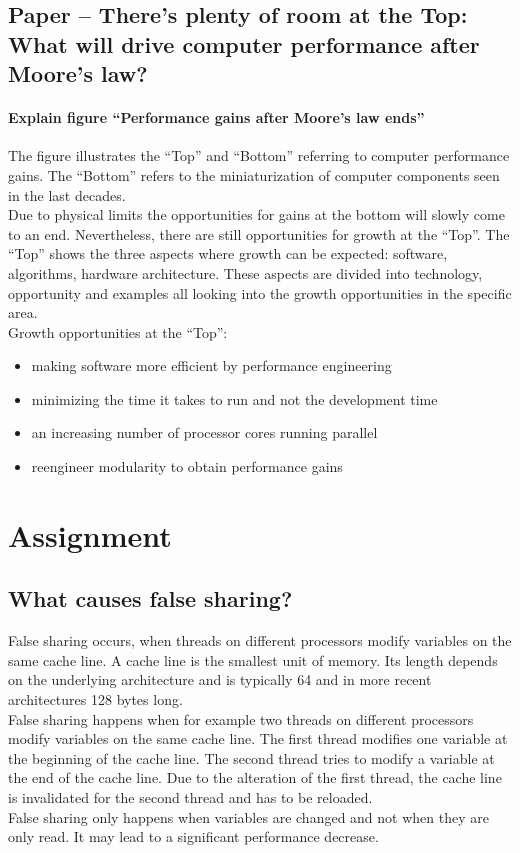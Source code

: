 \documentclass[runningheads]{llncs}
\begin{document}

\subsection {Paper – There’s plenty of room at the Top: What will drive computer performance after Moore’s law?}

\paragraph{Explain figure “Performance gains after Moore’s law ends”}
The figure illustrates the “Top” and “Bottom” referring to computer performance gains. The “Bottom” refers to the miniaturization of computer components seen in the last decades. \\
Due to physical limits the opportunities for gains at the bottom will slowly come to an end. Nevertheless, there are still opportunities for growth at the “Top”. The “Top” shows the three aspects where growth can be expected: software, algorithms, hardware architecture. These aspects are divided into technology, opportunity and examples all looking into the growth opportunities in the specific area.
\\
Growth opportunities at the “Top”:
\begin{itemize}
	\item making software more efficient by performance engineering
	\item minimizing the time it takes to run and not the development time
	\item an increasing number of processor cores running parallel
	\item reengineer modularity to obtain performance gains
\end{itemize}


\section{Assignment}

\subsection{What causes false sharing?}
False sharing occurs, when threads on different processors modify variables on the same cache line. A cache line is the smallest unit of memory. Its length depends on the underlying architecture and is typically 64 and in more recent architectures 128 bytes long.
\\
False sharing happens when for example two threads on different processors modify variables on the same cache line. The first thread modifies one variable at the beginning of the cache line. The second thread tries to modify a variable at the end of the cache line. Due to the alteration of the first thread, the cache line is invalidated for the second thread and has to be reloaded.
\\
False sharing only happens when variables are changed and not when they are only read. It may lead to a significant performance decrease.
\end{document}
